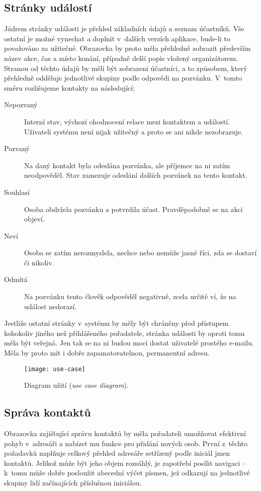 \documentclass[12pt,oneside,final]{fithesis2}
\begin{document}
\subsection{Stránky událostí}
Jádrem stránky události je přehled základních údajů a seznam účast\-ní\-ků. Vše os\-tat\-ní je možné vynechat a doplnit v~dalších verzích aplikace, bude-li to považováno za užitečné. Obrazovka by proto měla přehledně zobrazit především název akce, čas a místo konání, případně delší popis vložený organizátorem. Stranou od těchto údajů by měli být zobrazeni účastníci, a to způsobem, který přehledně odděluje jednotlivé skupiny podle odpovědi na pozvánku. V~tomto směru rozlišujeme kontakty na následující:

\begin{description}
    \item[Nepozvaný] Interní stav, výchozí ohodnocení relace mezi kontaktem a událostí. Uživateli systému není nijak užitečný a proto se ani nikde nezobrazuje.
    \item[Pozvaný] Na daný kontakt byla odeslána pozvánka, ale příjemce na ni zatím neodpověděl. Stav zamezuje odeslání dalších pozvánek na tento kontakt.
    \item[Souhlasí] Osoba obdržela pozvánku a potvrdila účast. Pravděpodobně se na akci objeví.
    \item[Neví] Osoba se zatím nerozmyslela, nechce nebo nemůže jasně říci, zda se dostaví či nikoliv.
    \item[Odmítá] Na pozvánku tento člověk odpověděl negativně, zcela určitě ví, že na událost nedorazí.
\end{description}

Jestliže ostatní stránky v~systému by měly být chráněny před přístupem kohokoliv jiného než přihlášeného pořadatele, stránka události by oproti tomu měla být veřejná. Jen tak se na ni budou moci dostat uživatelé prostého e-mailu. Měla by proto mít i dobře zapamatovatelnou, permanentní adresu.

\begin{figure}[p]
    \centering
    \texttt{[image: use-case]}
    \caption{Diagram užití (\emph{use case diagram}).}
    \label{useCase}
\end{figure}

\subsection{Správa kontaktů}
Obrazovka zajišťující správu kontaktů by měla pořadateli umožňovat efektivní pohyb v~adresáři a nabízet mu funkce pro přidání nových osob. První z~těchto požadavků naplňuje celkový přehled adresáře setřízený podle iniciál jmen kontaktů. Jelikož může být jeho objem rozsáhlý, je zapotřebí posílit navigaci -- k~tomu může dobře posloužit abecední výčet písmen, jež odkazují na jednotlivé skupiny lidí začínajících příslušnou iniciálou.
\end{document}
